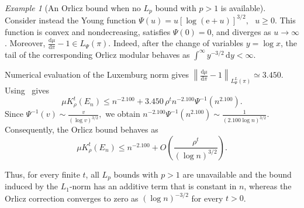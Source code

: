 \documentclass[11pt]{article}
\theoremstyle{plain}
\theoremstyle{remark}
\newtheorem{example}{Example}
\begin{document}
\begin{example}[An Orlicz bound when no $L_p$ bound with $p>1$ is available]
Consider instead the Young function $
    \Psi(u)
    =
    u\left[\log(\mathrm e+u)\right]^{3/2}, 
    \text{ }
    u\geq0.$
This function is convex and nondecreasing, satisfies $\Psi(0)=0$,
and diverges as $u\to\infty$. Moreover,
$ \frac{\mathrm d\mu}{\mathrm d\pi}-1
    \in L_\Psi(\pi).$ Indeed, after the change of variables $y=\log x$, the tail of the
corresponding Orlicz modular behaves as
 $\int^\infty y^{-3/2}\,\mathrm dy<\infty.$

Numerical evaluation of the Luxemburg norm gives $\left\lVert
        \frac{\mathrm d\mu}{\mathrm d\pi}-1
    \right\rVert_{L_\Psi^L(\pi)}
    \simeq3.450.$
Using~ gives
\[
    \mu K_\rho^t(E_n)
    \leq
    n^{-2.100}
    +
    3.450 \,\rho^t
    n^{-2.100}\Psi^{-1}\left(n^{2.100}\right).
\]
Since $
    \Psi^{-1}(v)
    \sim
    \frac{v}{(\log v)^{3/2}},$
we obtain $n^{-2.100}\Psi^{-1}\left(n^{2.100}\right)
    \sim
    \frac{1}{(2.100\log n)^{3/2}}.$
Consequently, the Orlicz bound behaves as
\[
    \mu K_\rho^t(E_n)
    \leq
    n^{-2.100}
    +
    O\left(
        \frac{\rho^t}{(\log n)^{3/2}}
    \right).
\]

Thus, for every finite $t$, all $L_p$ bounds with $p>1$ are
unavailable and the bound induced by the $L_1$-norm has an additive term that is constant in $n$, whereas the
Orlicz correction converges to zero as $(\log n)^{-3/2}$ for every $t>0$.

\end{example}
\end{document}
